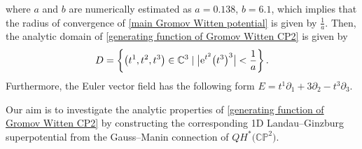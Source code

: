 where $a$ and $b$ are numerically estimated as
$a = 0.138$, $ b = 6.1$,
which implies that the radius of convergence of \eqref{main Gromov Witten potential} is given by $\frac{1}{a}$. Then, the analytic domain of \eqref{generating function of Gromov Witten CP2} is given by
\begin{gather}\label{WDVV domain}
D = \left\{\bigl(t^1, t^2, t^3\bigr) \in \mathbb{C}^3 \mid \big|{\rm e}^{t^2}\bigl(t^3\bigr)^3\big| < \frac{1}{a}\right\}.
\end{gather}
Furthermore, the Euler vector field has the following form
$E = t^1\partial_1 + 3\partial_2 - t^3\partial_3$.

Our aim is to investigate the analytic properties of \eqref{generating function of Gromov Witten CP2} by constructing the corresponding 1D Landau--Ginzburg superpotential from the Gauss--Manin connection of $QH^{*}\bigl(\mathbb{CP}^2\bigr)$.

